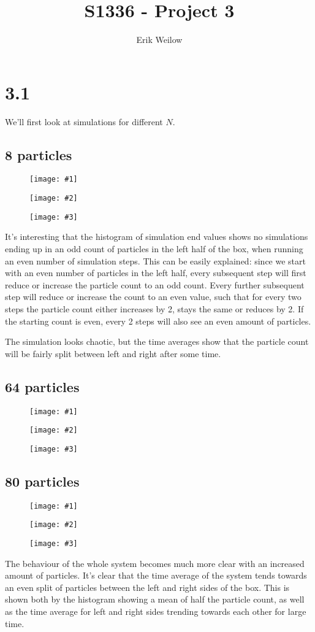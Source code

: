 \documentclass[11pt]{article}
\title{S1336 - Project 3}
\author{Erik Weilow}
\newcommand{\triplefigure}[3]{
\begin{figure}[H]
  \centering
  \begin{minipage}{0.3\textwidth}
    \centering
    \texttt{[image: \#1]}
  \end{minipage}
  \begin{minipage}{0.3\textwidth}
    \centering
    \texttt{[image: \#2]}
  \end{minipage}
  \begin{minipage}{0.3\textwidth}
    \centering
    \texttt{[image: \#3]}
  \end{minipage}
\end{figure}
}
\begin{document}
\maketitle
\newpage

\section*{3.1}

We'll first look at simulations for different $N$.

\subsection*{8 particles}
\triplefigure{./plots/3_1/8_histogram.png}{./plots/3_1/8_study.png}{./plots/3_1/8_study_mean.png}
It's interesting that the histogram of simulation end values shows no simulations ending up in an odd count of particles in the left half of the box, 
when running an even number of simulation steps. 
This can be easily explained: 
since we start with an even number of particles in the left half, every subsequent step will first reduce or increase the particle count to an odd count.
Every further subsequent step will reduce or increase the count to an even value, such that for every two steps the particle count either increases by 2, stays the same or reduces by 2.
If the starting count is even, every 2 steps will also see an even amount of particles.

The simulation looks chaotic, but the time averages show that the particle count will be fairly split between left and right after some time.

\subsection*{64 particles}
\triplefigure{./plots/3_1/64_histogram.png}{./plots/3_1/64_study.png}{./plots/3_1/64_study_mean.png}


\subsection*{80 particles}
\triplefigure{./plots/3_1/80_histogram.png}{./plots/3_1/80_study.png}{./plots/3_1/80_study_mean.png}

The behaviour of the whole system becomes much more clear with an increased amount of particles. 
It's clear that the time average of the system tends towards an even split of particles between the left and right sides of the box.
This is shown both by the histogram showing a mean of half the particle count, as well as the time average for left and right sides trending towards each other for large time.
\end{document}
